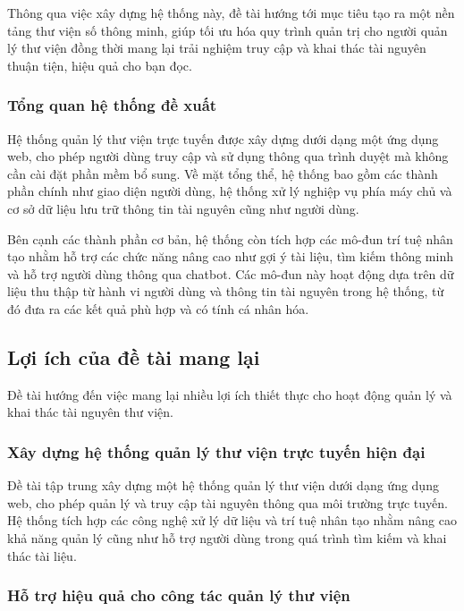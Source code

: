 Thông qua việc xây dựng hệ thống này, đề tài hướng tới mục tiêu tạo ra một nền tảng thư viện số thông minh, giúp tối ưu hóa quy trình quản trị cho người quản lý thư viện đồng thời mang lại trải nghiệm truy cập và khai thác tài nguyên thuận tiện, hiệu quả cho bạn đọc.

\subsubsection{Tổng quan hệ thống đề xuất}

Hệ thống quản lý thư viện trực tuyến được xây dựng dưới dạng một ứng dụng web, cho phép người dùng truy cập và sử dụng thông qua trình duyệt mà không cần cài đặt phần mềm bổ sung. Về mặt tổng thể, hệ thống bao gồm các thành phần chính như giao diện người dùng, hệ thống xử lý nghiệp vụ phía máy chủ và cơ sở dữ liệu lưu trữ thông tin tài nguyên cũng như người dùng.

Bên cạnh các thành phần cơ bản, hệ thống còn tích hợp các mô-đun trí tuệ nhân tạo nhằm hỗ trợ các chức năng nâng cao như gợi ý tài liệu, tìm kiếm thông minh và hỗ trợ người dùng thông qua chatbot. Các mô-đun này hoạt động dựa trên dữ liệu thu thập từ hành vi người dùng và thông tin tài nguyên trong hệ thống, từ đó đưa ra các kết quả phù hợp và có tính cá nhân hóa.

\subsection{Lợi ích của đề tài mang lại}

Đề tài hướng đến việc mang lại nhiều lợi ích thiết thực cho hoạt động quản lý và khai thác tài nguyên thư viện.

\subsubsection{Xây dựng hệ thống quản lý thư viện trực tuyến hiện đại}

Đề tài tập trung xây dựng một hệ thống quản lý thư viện dưới dạng ứng dụng web, cho phép quản lý và truy cập tài nguyên thông qua môi trường trực tuyến. Hệ thống tích hợp các công nghệ xử lý dữ liệu và trí tuệ nhân tạo nhằm nâng cao khả năng quản lý cũng như hỗ trợ người dùng trong quá trình tìm kiếm và khai thác tài liệu.

\subsubsection{Hỗ trợ hiệu quả cho công tác quản lý thư viện}

